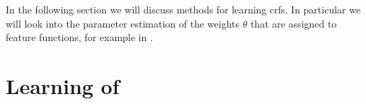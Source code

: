 \bigskip


In the following section we will discuss methods for learning \glspl{crf}.
In particular we will look into the parameter estimation of the weights $\theta$ that are assigned to \glspl{feature function}, for example in .

\section{Learning of }\label{sec:learning-crfs}


